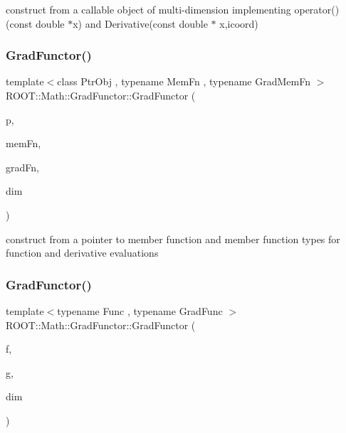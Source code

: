 construct from a callable object of multi-\/dimension implementing operator()(const double $\ast$x) and Derivative(const double $\ast$ x,icoord) \mbox{\label{classROOT_1_1Math_1_1GradFunctor_af7c06950b37bea8844b81f53b0bf41df}} 
\subsubsection{\texorpdfstring{GradFunctor()}{GradFunctor()}\hspace{0.1cm}{\footnotesize\ttfamily [3/10]}}
{\footnotesize\ttfamily template$<$class Ptr\+Obj , typename Mem\+Fn , typename Grad\+Mem\+Fn $>$ \\
R\+O\+O\+T\+::\+Math\+::\+Grad\+Functor\+::\+Grad\+Functor (\begin{DoxyParamCaption}\item[{const Ptr\+Obj \&}]{p,  }\item[{Mem\+Fn}]{mem\+Fn,  }\item[{Grad\+Mem\+Fn}]{grad\+Fn,  }\item[{unsigned int}]{dim }\end{DoxyParamCaption})\hspace{0.3cm}{\ttfamily [inline]}}

construct from a pointer to member function and member function types for function and derivative evaluations \mbox{\label{classROOT_1_1Math_1_1GradFunctor_a079a63821986eb0ce6e011c366c1cb9a}} 
\subsubsection{\texorpdfstring{GradFunctor()}{GradFunctor()}\hspace{0.1cm}{\footnotesize\ttfamily [4/10]}}
{\footnotesize\ttfamily template$<$typename Func , typename Grad\+Func $>$ \\
R\+O\+O\+T\+::\+Math\+::\+Grad\+Functor\+::\+Grad\+Functor (\begin{DoxyParamCaption}\item[{const Func \&}]{f,  }\item[{const Grad\+Func \&}]{g,  }\item[{int}]{dim }\end{DoxyParamCaption})\hspace{0.3cm}{\ttfamily [inline]}}

